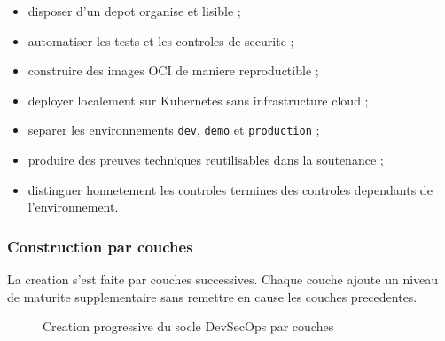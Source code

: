 \begin{itemize}
  \item disposer d'un depot organise et lisible ;
  \item automatiser les tests et les controles de securite ;
  \item construire des images OCI de maniere reproductible ;
  \item deployer localement sur Kubernetes sans infrastructure cloud ;
  \item separer les environnements \texttt{dev}, \texttt{demo} et
  \texttt{production} ;
  \item produire des preuves techniques reutilisables dans la soutenance ;
  \item distinguer honnetement les controles termines des controles dependants
  de l'environnement.
\end{itemize}

\subsubsection{Construction par couches}

La creation s'est faite par couches successives. Chaque couche ajoute un niveau
de maturite supplementaire sans remettre en cause les couches precedentes.

\begin{figure}[htbp]
\centering
{}
\caption{Creation progressive du socle DevSecOps par couches}
\label{fig:creation-devsecops-couches}
\end{figure}

